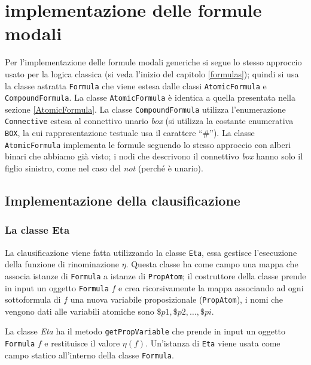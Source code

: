 \documentclass[a4paper,12pt]{report}
\begin{document}
\section{implementazione delle formule modali}
Per l'implementazione delle formule modali generiche si segue lo stesso approccio usato per la logica classica (si veda l'inizio del capitolo \ref{formulas}); quindi si usa la classe astratta \texttt{Formula} che viene estesa dalle classi \texttt{AtomicFormula} e \texttt{CompoundFormula}. La classe \texttt{AtomicFormula} è identica a quella presentata nella sezione \ref{AtomicFormula}. La classe \texttt{CompoundFormula} utilizza l'enumerazione \texttt{Connective} estesa al connettivo unario \emph{box} (si utilizza la costante enumerativa \texttt{BOX}, la cui rappresentazione testuale usa il carattere ``$\#$''). La classe \texttt{AtomicFormula} implementa le formule seguendo lo stesso approccio con alberi binari che abbiamo già visto; i nodi che descrivono il connettivo \emph{box} hanno solo il figlio sinistro, come nel caso del \emph{not} (perché è unario).

\subsection{Implementazione della clausificazione}
\label{clausification_impl}
\subsubsection{La classe Eta}
La clausificazione viene fatta utilizzando la classe \texttt{Eta}, essa gestisce l'esecuzione della funzione di rinominazione $\eta$. Questa classe ha come campo una mappa che associa istanze di \texttt{Formula} a istanze di \texttt{PropAtom}; il costruttore della classe prende in input un oggetto \texttt{Formula} $f$ e crea ricorsivamente la mappa associando ad ogni sottoformula di $f$ una nuova variabile proposizionale (\texttt{PropAtom}), i nomi che vengono dati alle variabili atomiche sono $\$p1, \$p2, \dots, \$pi$.

La classe \emph{Eta} ha il metodo \texttt{getPropVariable} che prende in input un oggetto \texttt{Formula} $f$ e restituisce il valore $\eta(f)$. Un'istanza di \texttt{Eta} viene usata come campo statico all'interno della classe \texttt{Formula}.
\end{document}
